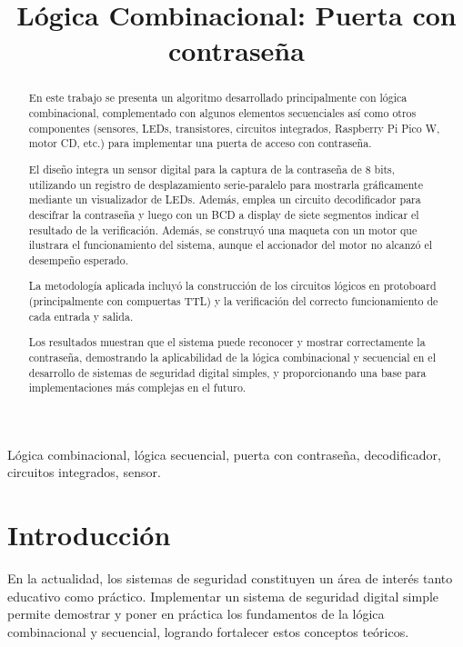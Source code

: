 \documentclass[conference]{IEEEtran}  %
\title{Lógica Combinacional: Puerta con contraseña}
\author{
    \IEEEauthorblockA{Instituto Tecnológico de Costa Rica\\
    Escuela de Ingeniería en Computadores\\
    CE1107 — Fundamentos de Arquitectura de Computadores\\}
    \IEEEauthorblockN{\\Autores: \\ Jafet José Diaz Morales - 2023053249 \\ Esteban Campos Abarca - 2022207705}
}
\begin{document}
\maketitle

\begin{abstract}
En este trabajo se presenta un algoritmo desarrollado principalmente con lógica combinacional, complementado con algunos elementos secuenciales así como otros componentes (sensores, LEDs, transistores, circuitos integrados, Raspberry Pi Pico W, motor CD, etc.) para implementar una puerta de acceso con contraseña. 

El diseño integra un sensor digital para la captura de la contraseña de 8 bits, utilizando un registro de desplazamiento serie-paralelo para mostrarla gráficamente mediante un visualizador de LEDs. Además, emplea un circuito decodificador para descifrar la contraseña y luego con un BCD a display de siete segmentos indicar el resultado de la verificación. Además, se construyó una maqueta con un motor que ilustrara el funcionamiento del sistema, aunque el accionador del motor no alcanzó el desempeño esperado. 

La metodología aplicada incluyó la construcción de los circuitos lógicos en protoboard (principalmente con compuertas TTL) y la verificación del correcto funcionamiento de cada entrada y salida. 

Los resultados muestran que el sistema puede reconocer y mostrar correctamente la contraseña, demostrando la aplicabilidad de la lógica combinacional y secuencial en el desarrollo de sistemas de seguridad digital simples, y proporcionando una base para implementaciones más complejas en el futuro.
\end{abstract}


\begin{IEEEkeywords}
Lógica combinacional, lógica secuencial, puerta con contraseña, decodificador, circuitos integrados, sensor.
\end{IEEEkeywords}

\section{Introducción}
En la actualidad, los sistemas de seguridad constituyen un área de interés tanto educativo como práctico. Implementar un sistema de seguridad digital simple permite demostrar y poner en práctica los fundamentos de la lógica combinacional y secuencial, logrando fortalecer estos conceptos teóricos. 
\end{document}
